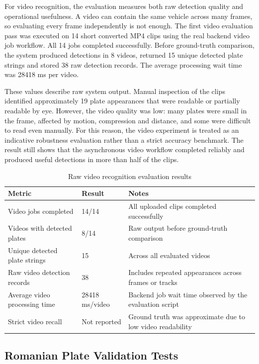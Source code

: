 ﻿\documentclass[12pt,a4paper]{article}
\begin{document}
For video recognition, the evaluation measures both raw detection quality and operational usefulness. A video can contain the same vehicle across many frames, so evaluating every frame independently is not enough. The first video evaluation pass was executed on 14 short converted MP4 clips using the real backend video job workflow. All 14 jobs completed successfully. Before ground-truth comparison, the system produced detections in 8 videos, returned 15 unique detected plate strings and stored 38 raw detection records. The average processing wait time was 28418 ms per video.

These values describe raw system output. Manual inspection of the clips identified approximately 19 plate appearances that were readable or partially readable by eye. However, the video quality was low: many plates were small in the frame, affected by motion, compression and distance, and some were difficult to read even manually. For this reason, the video experiment is treated as an indicative robustness evaluation rather than a strict accuracy benchmark. The result still shows that the asynchronous video workflow completed reliably and produced useful detections in more than half of the clips.

\begin{table}[H]
\centering
\begin{tabular}{|p{5cm}|p{4cm}|p{5cm}|}
\hline
\textbf{Metric} & \textbf{Result} & \textbf{Notes} \\
\hline
Video jobs completed & 14/14 & All uploaded clips completed successfully \\
\hline
Videos with detected plates & 8/14 & Raw output before ground-truth comparison \\
\hline
Unique detected plate strings & 15 & Across all evaluated videos \\
\hline
Raw video detection records & 38 & Includes repeated appearances across frames or tracks \\
\hline
Average video processing time & 28418 ms/video & Backend job wait time observed by the evaluation script \\
\hline
Strict video recall & Not reported & Ground truth was approximate due to low video readability \\
\hline
\end{tabular}
\caption{Raw video recognition evaluation results}
\end{table}

\subsection{Romanian Plate Validation Tests}
\end{document}
